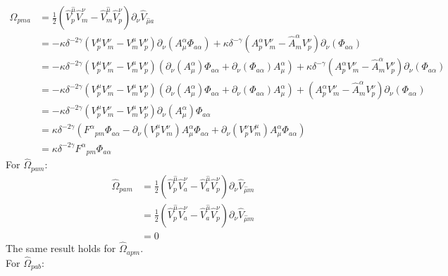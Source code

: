 \documentclass{article}
\begin{document}
\begin{align*}
    \hat \Omega_{pma} &= \frac{1}{2}(\hat V^{\hat \mu}_{  p} \hat V^{ \nu}_{m}-\hat V^{\hat \mu}_{m} \hat V^{ \nu}_{p})\partial_{ \nu} \hat V_{\hat \mu a}\\
    &= -\kappa \delta^{-2\gamma}( V^{\mu}_{  p}  V^{ \nu}_{m}-  V^{ \mu}_{m} V^{ \nu}_{p})\partial_{ \nu} (A^{\alpha}_{\mu}\Phi_{a\alpha}) + \kappa \delta^{-\gamma}( A^\alpha_p V^{ \nu}_{m}- \hat A^{\alpha}_{m} V^{ \nu}_{p})\partial_{ \nu} (\Phi_{a\alpha})\\
    &= -\kappa \delta^{-2 \gamma} (V^{ \mu}_{  p}  V^{ \nu}_{m}- V^{ \mu}_{m}  V^{ \nu}_{p})(\partial_{ \nu} (A^{\alpha}_{\mu})\Phi_{a\alpha}+\partial_{ \nu}(\Phi_{a\alpha})A^{\alpha}_{\mu}) + \kappa \delta^{-\gamma}( A^\alpha_p V^{ \nu}_{m}- \hat A^{\alpha}_{m} V^{ \nu}_{p})\partial_{ \nu} (\Phi_{a\alpha}) \\
    &= -\kappa \delta^{-2 \gamma} (V^{ \mu}_{  p}  V^{ \nu}_{m}- V^{ \mu}_{m}  V^{ \nu}_{p})(\partial_{ \nu} (A^{\alpha}_{\mu})\Phi_{a\alpha}+\partial_{ \nu}(\Phi_{a\alpha})A^{\alpha}_{\mu}) + (A^\alpha_p V^{ \nu}_{m}- \hat A^{\alpha}_{m} V^{ \nu}_{p})\partial_{ \nu} (\Phi_{a\alpha}) \\
    &= -\kappa \delta^{-2 \gamma} (V^{ \mu}_{  p}  V^{ \nu}_{m}- V^{ \mu}_{m}  V^{ \nu}_{p})\partial_{ \nu} (A^{\alpha}_{\mu})\Phi_{a\alpha}\\
    &= \kappa \delta^{-2 \gamma} (F^\alpha{}_{pm}\Phi_{a\alpha}- \partial_\nu(V^{ \mu}_{  p}  V^{ \nu}_{m})A^{\alpha}_{\mu}\Phi_{a\alpha}+ \partial_\nu(V^{ \nu}_{  p}  V^{ \mu}_{m})A^{\alpha}_{\mu}\Phi_{a\alpha})\\
    &= \kappa \delta^{-2 \gamma} F^\alpha{}_{pm}\Phi_{a\alpha}
\end{align*}
For $\hat \Omega_{pam}$:
\begin{align*}
    \hat \Omega_{pam} &= \frac{1}{2}(\hat V^{\hat \mu}_{  p} \hat V^{ \nu}_{a}-\hat V^{\hat \mu}_{a} \hat V^{ \nu}_{p})\partial_{ \nu} \hat V_{\hat \mu m}\\
    &=\frac{1}{2}(\hat V^{\hat \mu}_{  p} \hat V^{ \nu}_{a}-\hat V^{\hat \mu}_{a} \hat V^{ \nu}_{p})\partial_{ \nu} \hat V_{\hat \mu m}\\
    &= 0
\end{align*}
The same result holds for $\hat \Omega_{apm}$.\\
For $\hat \Omega_{pab}$:
\end{document}
